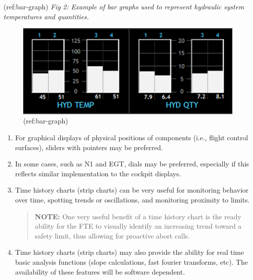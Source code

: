 \documentclass[
]{book}
\begin{document}
\begin{enumerate}
\begin{enumerate}
    (ref:bar-graph) \emph{Fig 2: Example of bar graphs used to represent hydraulic system temperatures and quantities.}

    \begin{figure}
    \centering
    \includegraphics{media/21/bar-graphs.png}
    \caption{(ref:bar-graph)}
    \end{figure}

    \begin{enumerate}
    \def\labelenumiii{\arabic{enumiii}.}
    \setcounter{enumiii}{6}
    \item
      For graphical displays of physical positions of components (i.e., flight control surfaces), sliders with pointers may be preferred.
    \item
      In some cases, such as N1 and EGT, dials may be preferred, especially if this reflects similar implementation to the cockpit displays.
    \item
      Time history charts (strip charts) can be very useful for monitoring behavior over time, spotting trends or oscillations, and monitoring proximity to limits.

      \begin{quote}
      \textbf{NOTE:} One very useful benefit of a time history chart is the ready ability for the FTE to visually identify an increasing trend toward a safety limit, thus allowing for proactive abort calls.
      \end{quote}
    \item
      Time history charts (strip charts) may also provide the ability for real time basic analysis functions (slope calculations, fast fourier transforms, etc). The availability of these features will be software dependent.


\end{enumerate}
\end{enumerate}
\end{enumerate}
\end{document}
